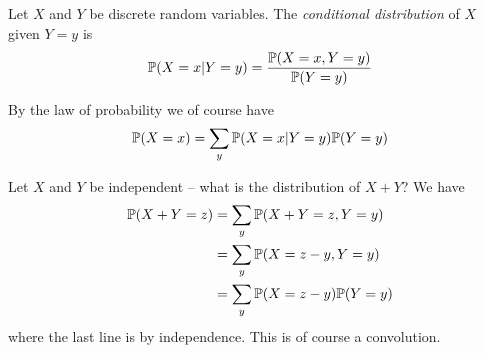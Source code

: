 \documentclass{../../template/note}
\begin{document}
    \begin{definition}
        Let \(X\) and \(Y\) be discrete random variables. The \emph{conditional distribution} of \(X\) given \(Y = y\) is
        \begin{align*}
            \mathbb P(X = x | Y = y) = \frac{\mathbb P(X = x, Y = y)}{\mathbb P(Y = y)}
        \end{align*}
    \end{definition}
    By the law of probability we of course have
    \begin{align*}
        \mathbb P(X = x) = \sum_y \mathbb P(X = x| Y = y)\mathbb P(Y = y)
    \end{align*}
    

    Let \(X\) and \(Y\) be independent -- what is the distribution of \(X+Y\)? We have
    \begin{align*}
        \mathbb P(X + Y = z) &= \sum_y \mathbb P(X + Y = z, Y = y) \\
        &= \sum_y \mathbb P(X = z-y, Y = y) \\
        &= \sum_y \mathbb P(X = z-y)\mathbb P(Y = y)
    \end{align*}
    where the last line is by independence. This is of course a convolution.
\end{document}
